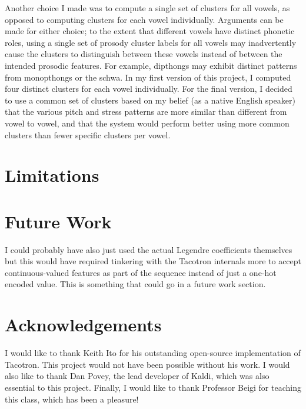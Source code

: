 \documentclass{article}
\begin{document}
Another choice I made was to compute a single set of clusters for all vowels, as opposed to computing clusters for each vowel individually.
Arguments can be made for either choice; to the extent that different vowels have distinct phonetic roles, using a single set of prosody cluster labels for all vowels may inadvertently cause the clusters to distinguish between these vowels instead of between the intended prosodic features. For example, dipthongs may exhibit distinct patterns from monopthongs or the schwa.
In my first version of this project, I computed four distinct clusters for each vowel individually. For the final version, I decided to use a common set of clusters based on my belief (as a native English speaker) that the various pitch and stress patterns are more similar than different from vowel to vowel, and that the system would perform better using more common clusters than fewer specific clusters per vowel.

\section{Limitations}

\section{Future Work}

I could probably have also just used the actual Legendre coefficients themselves but this would have required tinkering with the Tacotron internals more to accept continuous-valued features as part of the sequence instead of just a one-hot encoded value. This is something that could go in a future work section.

\section{Acknowledgements}
\label{sec:acknowledgements}
I would like to thank Keith Ito for his outstanding open-source implementation of Tacotron. This project would not have been possible without his work. I would also like to thank Dan Povey, the lead developer of Kaldi, which was also essential to this project. Finally, I would like to thank Professor Beigi for teaching this class, which has been a pleasure!
\end{document}
